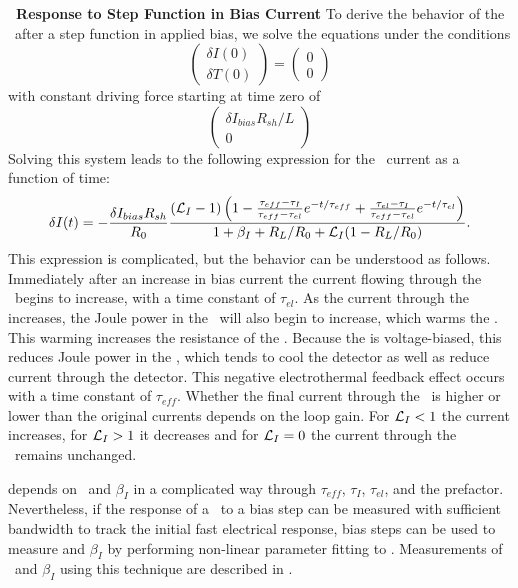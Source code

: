 \textbf{\TES\ Response to Step Function in Bias Current}
To derive the behavior of the \TES\ after a step function in applied bias, we solve the equations under the conditions
\begin{equation}
\begin{pmatrix} \delta I(0) \\ \delta T(0) \end{pmatrix} = \begin{pmatrix} 0 \\ 0 \end{pmatrix}
\end{equation}
with constant driving force starting at time zero of
\begin{equation}
\begin{pmatrix} \delta I_{bias} R_{sh} / L \\ 0 \end{pmatrix}
\end{equation}
Solving this system leads to the following expression for the \TES\ current as a function of time:
\begin{equation}\label{eqn:bias-step-resp}
\delta I (t)
   = - \frac{\delta I_{bias} R_{sh}}{R_0} 
       \frac{(\mathcal{L}_I - 1)
             \left(1 - \frac{\tau_{eff} - \tau_I}{\tau_{eff} - \tau_{el}} e^{-t/\tau_{eff}}
                 	       + \frac{\tau_{el} - \tau_I}{\tau_{eff} - \tau_{el}} e^{-t/\tau_{el}} \right)}
            {1 + \beta_I + R_L/R_0 + \mathcal{L}_I(1 - R_L/R_0)}
       .
\end{equation}
This expression is complicated, but the behavior can be understood as follows.
Immediately after an increase in bias current the current flowing through the \TES\ begins to increase, with a time constant of $\tau_{el}$.
As the current through the \TES increases, the Joule power in the \TES\ will also begin to increase, which warms the \TES.
This warming increases the resistance of the \TES.
Because the \TES is voltage-biased, this reduces Joule power in the \TES, which tends to cool the detector as well as reduce current through the detector.
This negative electrothermal feedback effect occurs with a time constant of $\tau_{eff}$.
Whether the final current through the \TES\ is higher or lower than the original currents depends on the loop gain.
For $\mathcal{L}_I < 1$ the current increases, for $\mathcal{L}_I > 1$ it decreases and for $\mathcal{L}_I = 0$ the current through the \TES\ remains unchanged.

 depends on \Loop\ and $\beta_I$ in a complicated way through $\tau_{eff}$, $\tau_I$, $\tau_{el}$, and the prefactor.
Nevertheless, if the response of a \TES\ to a bias step can be measured with sufficient bandwidth to track the initial fast electrical response, bias steps can be used to measure \Loop and $\beta_I$ by performing non-linear parameter fitting to .
Measurements of \Loop\ and $\beta_I$ using this technique are described in .

